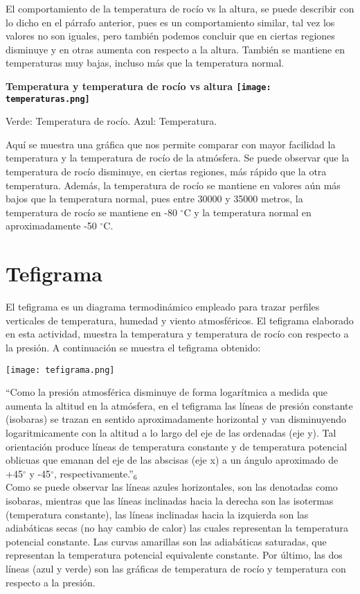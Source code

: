 \documentclass[12pt]{article}
\begin{document}
\begin{doublespace}
El comportamiento de la temperatura de rocío vs la altura, se puede describir con lo dicho en el párrafo anterior, pues es un comportamiento similar, tal vez los valores no son iguales, pero también podemos concluir que en ciertas regiones disminuye y en otras aumenta con respecto a la altura. También se mantiene en temperaturas muy bajas, incluso más que la temperatura normal.

\pagebreak
\begin{center}
\bfseries Temperatura y temperatura de rocío vs altura
\texttt{[image: temperaturas.png]}

Verde: Temperatura de rocío.
Azul: Temperatura.
\end{center}

Aquí se muestra una gráfica que nos permite comparar con mayor facilidad la temperatura y la temperatura de rocío de la atmósfera. Se puede observar que la temperatura de rocío disminuye, en ciertas regiones, más rápido que la otra temperatura. Además, la temperatura de rocío se mantiene en valores aún más bajos que la temperatura normal, pues entre 30000 y 35000 metros, la temperatura de rocío se mantiene en -80 $^{\circ}$C y la temperatura normal en aproximadamente -50 $^{\circ}$C. 
\section{Tefigrama}
El tefigrama es un diagrama termodinámico empleado para trazar perfiles verticales de temperatura, humedad y viento atmosféricos. El tefigrama elaborado en esta actividad, muestra la temperatura y temperatura de rocío con respecto a la presión. A continuación se muestra el tefigrama obtenido:
\begin{center}
\texttt{[image: tefigrama.png]}
\end{center}

``Como la presión atmosférica disminuye de forma logarítmica a medida que aumenta la altitud en la atmósfera, en el tefigrama las líneas de presión constante (isobaras) se trazan en sentido aproximadamente horizontal y van disminuyendo logaritmicamente con la altitud a lo largo del eje de las ordenadas (eje y). Tal orientación produce líneas de temperatura constante y de temperatura potencial oblicuas que emanan del eje de las abscisas (eje x) a un ángulo aproximado de +45$^{\circ}$ y -45$^{\circ}$, respectivamente.''$_{6}$
\\

Como se puede observar las líneas azules horizontales, son las denotadas como isobaras, mientras que las líneas inclinadas hacia la derecha son las isotermas (temperatura constante), las líneas inclinadas hacia la izquierda son las adiabáticas secas (no hay cambio de calor) las cuales representan la temperatura potencial constante. Las curvas amarillas son las adiabáticas saturadas, que representan la temperatura potencial equivalente constante. Por último, las dos líneas (azul y verde) son las gráficas de temperatura de rocío y temperatura con respecto a la presión.
\\


\end{doublespace}
\end{document}
